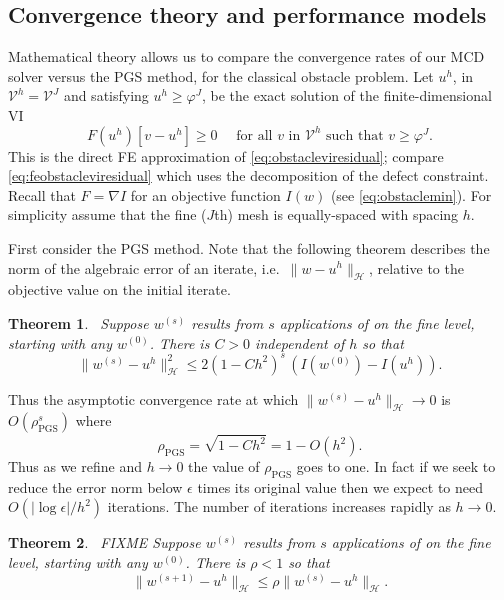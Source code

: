 \documentclass[letterpaper,final,12pt,reqno]{amsart}
\theoremstyle{claim}
\newtheorem{theorem}{Theorem}
\newcommand{\eps}{\epsilon}
\newcommand{\grad}{\nabla}
\numberwithin{equation}{section}
\numberwithin{figure}{section}
\numberwithin{table}{section}
\numberwithin{theorem}{section}
\begin{document}
\subsection*{Convergence theory and performance models}  Mathematical theory allows us to compare the convergence rates of our MCD solver versus the PGS method, for the classical obstacle problem.  Let $u^h$, in $\mathcal{V}^h = \mathcal{V}^J$ and satisfying $u^h \ge \varphi^J$, be the exact solution of the finite-dimensional VI
\begin{equation}
  F(u^h)[v-u^h] \ge 0 \quad \text{ for all } v \text{ in $\mathcal{V}^h$ such that } v \ge \varphi^J. \label{eq:feobstaclevioriginal}
\end{equation}
This is the direct FE approximation of \eqref{eq:obstacleviresidual}; compare \eqref{eq:feobstacleviresidual} which uses the decomposition of the defect constraint.  Recall that $F=\grad I$ for an objective function $I(w)$ (see \eqref{eq:obstaclemin}).  For simplicity assume that the fine ($J$th) mesh is equally-spaced with spacing $h$.

First consider the PGS method.  Note that the following theorem describes the norm of the algebraic error of an iterate, i.e.~$\|w-u^h\|_{\mathcal{H}}$, relative to the objective value on the initial iterate.

\begin{theorem} \cite[Prop.~4.5]{GraeserKornhuber2009}\,  \label{thm:pgsconvergence}  Suppose $w^{(s)}$  results from $s$ applications of  on the fine level, starting with any $w^{(0)}$.  There is $C>0$ independent of $h$ so that
\begin{equation}
  \|w^{(s)} - u^h\|_{\mathcal{H}}^2 \le 2 (1-C h^2)^s\,\left(I(w^{(0)}) - I(u^h)\right).  \label{eq:pgsconvergence}
\end{equation}
\end{theorem}

Thus the asymptotic convergence rate at which $\|w^{(s)} - u^h\|_{\mathcal{H}} \to 0$ is $O(\rho_{\text{PGS}}^s)$ where
    $$\rho_{\text{PGS}} = \sqrt{1-Ch^2} = 1 - O(h^2).$$
Thus as we refine and $h\to 0$ the value of $\rho_{\text{PGS}}$ goes to one.  In fact if we seek to reduce the error norm below $\eps$ times its original value then we expect to need $O(|\log\eps|/h^2)$ iterations.  The number of iterations increases rapidly as $h\to 0$.

\begin{theorem} \cite[Thm.~4.6]{GraeserKornhuber2009}\,  \label{thm:mcdlconvergence}  FIXME Suppose $w^{(s)}$  results from $s$ applications of  on the fine level, starting with any $w^{(0)}$.  There is $\rho<1$ so that
\begin{equation}
  \|w^{(s+1)} - u^h\|_{\mathcal{H}} \le \rho \|w^{(s)} - u^h\|_{\mathcal{H}}.  \label{eq:mcdlconvergence}
\end{equation}
\end{theorem}
\end{document}
